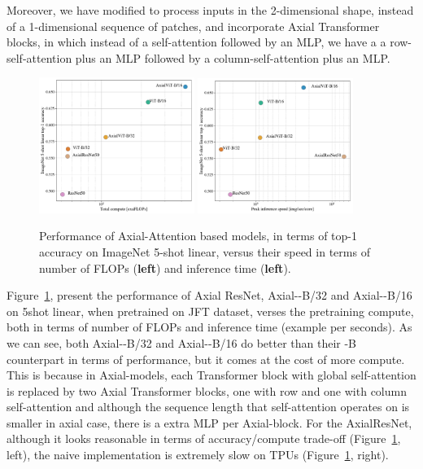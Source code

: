 Moreover, we have modified \oursabbrv to process inputs in the 2-dimensional shape, instead of a 1-dimensional sequence of patches, and incorporate Axial Transformer blocks, in which instead of a self-attention followed by an MLP, we have a a row-self-attention plus an MLP followed by a column-self-attention plus an MLP. 
\begin{figure}[h]
    \centering
    \includegraphics[width=0.45\textwidth]{images/compute_analysis/axial_flop.pdf}
    \hspace{10pt}
    \includegraphics[width=0.45\textwidth]{images/compute_analysis/axial_img_sec_core.pdf}
    \caption{Performance of Axial-Attention based models, in terms of top-1 accuracy on ImageNet 5-shot linear, versus their speed in terms of number of FLOPs (\textbf{left}) and inference time (\textbf{left}).}
    \label{fig:axial_compute_performance}
\end{figure}

Figure~\ref{fig:axial_compute_performance}, present the performance of Axial ResNet, Axial-\oursabbrv-B/32 and Axial-\oursabbrv-B/16 on \imagenet 5shot linear, when pretrained on JFT dataset, verses the pretraining compute, both in terms of number of FLOPs and inference time (example per seconds). As we can see, both 
Axial-\oursabbrv-B/32 and Axial-\oursabbrv-B/16 do better than their \oursabbrv-B counterpart in terms of performance, but it comes at the cost of more compute. This is because in Axial-\oursabbrv models, each Transformer block with global self-attention is replaced by two Axial Transformer blocks, one with row and one with column self-attention and although the sequence length that self-attention operates on is smaller in axial case, there is a extra MLP per Axial-\oursabbrv block.  
For the AxialResNet, although it looks reasonable in terms of accuracy/compute trade-off (Figure~\ref{fig:axial_compute_performance}, left), the naive implementation is extremely slow on TPUs (Figure~\ref{fig:axial_compute_performance}, right).


